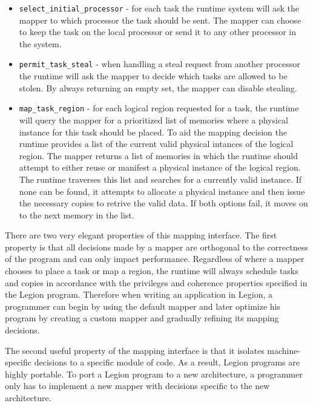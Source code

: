 \begin{itemize}
\item {\tt select\_initial\_processor} - for each task the runtime system will
ask the mapper to which processor the task should be sent.  The mapper 
can choose to keep the task on the local processor or send it to any other processor
in the system.

\item {\tt permit\_task\_steal} - when handling a steal request from another processor
the runtime will ask the mapper to decide which tasks are allowed to be stolen.  
By always returning an empty set, the mapper can disable stealing.

\item {\tt map\_task\_region} - for each logical region requested for a task, the
runtime will query the mapper for a prioritized list of memories where a physical instance for this
task should be placed.  To aid the mapping decision the runtime provides a list of the current valid physical intances
of the logical region.  The mapper returns a list of memories in which the runtime
should attempt to either reuse or manifest a physical instance of the logical region.  The
runtime traverses this list and searches for a currently valid instance.  If none can be
found, it attempts to allocate a physical instance and then issue the necessary copies
to retrive the valid data.  If both options fail, it moves on to the next memory in the list.
\end{itemize}

There are two very elegant properties of this mapping interface.  The first property is
that all decisions made by a mapper are orthogonal to the correctness of the program and can only 
impact performance.  Regardless of where a mapper chooses to place a task or map a region, 
the runtime will always schedule tasks and copies in accordance with the privileges and 
coherence properties specified in the Legion program.  Therefore when writing an application
in Legion, a programmer can begin by using the default mapper and later optimize his program
by creating a custom mapper and gradually refining its mapping decisions.

The second useful property of the mapping interface is that it isolates machine-specific decisions
to a specific module of code.  As a result, Legion programs are highly
portable.  To port a Legion program to a new architecture, a programmer only has to
implement a new mapper with decisions specific to the new architecture. 

